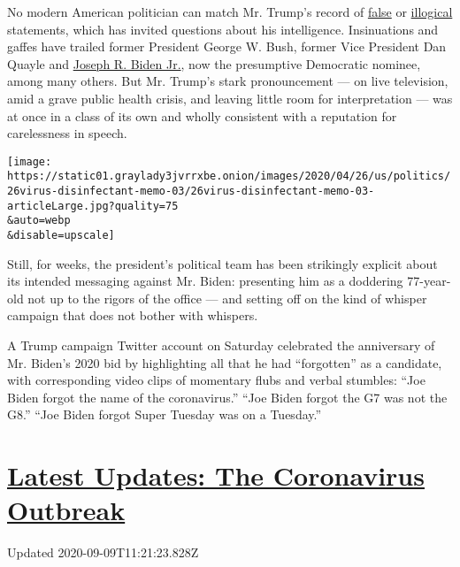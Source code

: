 No modern American politician can match Mr. Trump's record of
\href{https://www.nytimes3xbfgragh.onion/spotlight/fact-checks}{false}
or
\href{https://www.nytimes3xbfgragh.onion/interactive/2019/11/02/us/politics/trump-twitter-presidency.html}{illogical}
statements, which has invited questions about his intelligence.
Insinuations and gaffes have trailed former President George W. Bush,
former Vice President Dan Quayle and
\href{https://www.nytimes3xbfgragh.onion/interactive/2020/us/elections/joe-biden.html}{Joseph
R. Biden Jr.}, now the presumptive Democratic nominee, among many
others. But Mr. Trump's stark pronouncement --- on live television, amid
a grave public health crisis, and leaving little room for interpretation
--- was at once in a class of its own and wholly consistent with a
reputation for carelessness in speech.

\texttt{[image: https://static01.graylady3jvrrxbe.onion/images/2020/04/26/us/politics/26virus-disinfectant-memo-03/26virus-disinfectant-memo-03-articleLarge.jpg?quality=75\\\&auto=webp\\\&disable=upscale]}

Still, for weeks, the president's political team has been strikingly
explicit about its intended messaging against Mr. Biden: presenting him
as a doddering 77-year-old not up to the rigors of the office --- and
setting off on the kind of whisper campaign that does not bother with
whispers.

A Trump campaign Twitter account on Saturday celebrated the anniversary
of Mr. Biden's 2020 bid by highlighting all that he had ``forgotten'' as
a candidate, with corresponding video clips of momentary flubs and
verbal stumbles: ``Joe Biden forgot the name of the coronavirus.'' ``Joe
Biden forgot the G7 was not the G8.'' ``Joe Biden forgot Super Tuesday
was on a Tuesday.''

\hypertarget{latest-updates-the-coronavirus-outbreak}{%
\section{\texorpdfstring{\href{https://www.nytimes3xbfgragh.onion/2020/09/09/world/covid-19-coronavirus.html?action=click\&pgtype=Article\&state=default\&region=MAIN_CONTENT_1\&context=storylines_live_updates}{Latest
Updates: The Coronavirus
Outbreak}}{Latest Updates: The Coronavirus Outbreak}}\label{latest-updates-the-coronavirus-outbreak}}

Updated 2020-09-09T11:21:23.828Z

